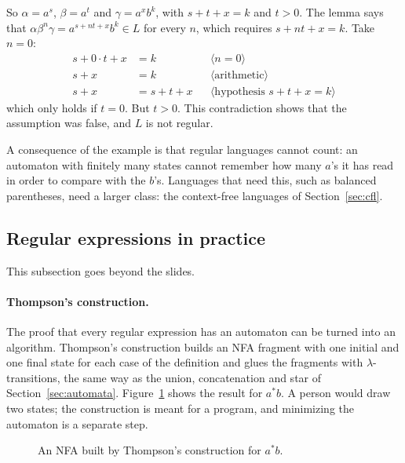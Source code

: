 So $\alpha = a^s$, $\beta = a^t$ and $\gamma = a^x b^k$, with $s + t + x = k$ and
$t > 0$. The lemma says that $\alpha\beta^n\gamma = a^{s + nt + x} b^k \in L$ for
every $n$, which requires $s + nt + x = k$. Take $n = 0$:
\begin{align*}
s + 0 \cdot t + x &= k && \langle n = 0 \rangle \\
s + x &= k && \langle \text{arithmetic} \rangle \\
s + x &= s + t + x && \langle \text{hypothesis } s + t + x = k \rangle
\end{align*}
which only holds if $t = 0$. But $t > 0$. This contradiction shows that the
assumption was false, and $L$ is not regular.

A consequence of the example is that regular languages cannot count: an
automaton with finitely many states cannot remember how many $a$'s it has
read in order to compare with the $b$'s. Languages that need this, such as
balanced parentheses, need a larger class: the context-free languages of
Section~\ref{sec:cfl}.

\subsection{Regular expressions in practice}

This subsection goes beyond the slides.

\paragraph{Thompson's construction.} The proof that every regular expression
has an automaton can be turned into an algorithm. Thompson's construction
builds an NFA fragment with one initial and one final state for each case of
the definition and glues the fragments with $\lambda$-transitions, the same way
as the union, concatenation and star of Section~\ref{sec:automata}.
Figure~\ref{fig:thompson} shows the result for $a^*b$. A person would draw
two states; the construction is meant for a program, and minimizing the
automaton is a separate step.

\begin{figure}[h]
\centering
{}
\caption{An NFA built by Thompson's construction for $a^*b$.}
\label{fig:thompson}
\end{figure}

